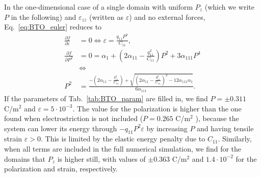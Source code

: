 In the one-dimensional case of a single domain with uniform $P_z$ (which we write $P$ in the following) and $\varepsilon_{zz}$ (written as $\varepsilon$) and no external forces, Eq.~\ref{eq:BTO_euler} reduces to  
\begin{align}
	\frac{\partial f}{\partial \varepsilon} &= 0 \Leftrightarrow \varepsilon = \frac{q_{11}P^2}{C_{11}}\label{eq:BTO_e0},\\
	\frac{\partial f}{\partial P^2} &= 0 = \alpha_1 + (2 \alpha_{11} - \frac{q_{11}^2}{C_{11}})P^2 + 3\alpha_{111}P^4 \\
	& \Leftrightarrow \\
	P^2 &= \frac{-(2\alpha_{11} - \frac{q_{11}^2}{C_{11}}) + \sqrt{(2\alpha_{11}-\frac{q_{11}^2}{C_{11}})^2 - 12 \alpha_{111} \alpha_1}}{6\alpha_{111}}.
\end{align}
If the parameters of Tab.~\ref{tab:BTO_param} are filled in, we find $P = \pm 0.311$ C/m$^2$ and $\varepsilon = 5 \cdot 10^{-3}$.
The value for the polarization is higher than the one found when electrostriction is not included ($P = 0.265$ C/m$^2$ \cite{Marton2010}), because the system can lower its energy through $-q_{11}P^2\varepsilon$ by increasing $P$ and having tensile strain $\varepsilon > 0$. This is limited by the elastic energy penalty due to $C_11$.
Similarly, when all terms are included in the full numerical simulation, we find for the domains that $P_z$ is higher still, with values of $\pm 0.363$ C/m$^2$ and $1.4 \cdot 10^{-2}$ for the polarization and strain, respectively.

